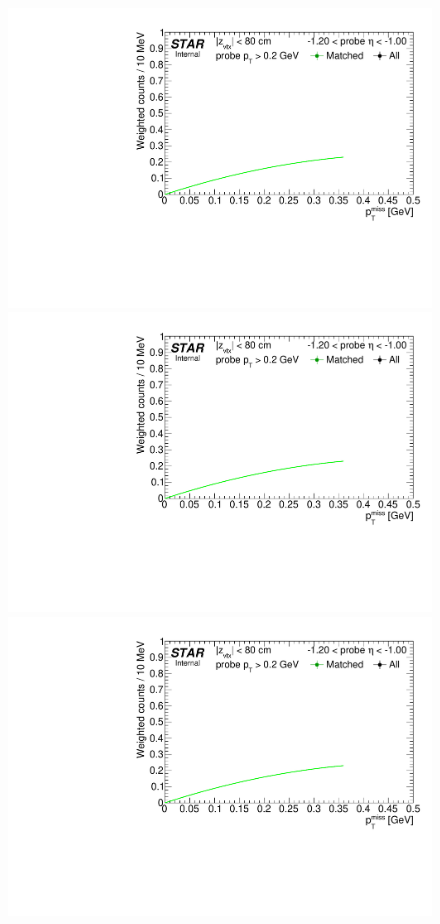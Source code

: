 \begin{figure}[ht]\ContinuedFloat
\centering
\parbox{0.495\textwidth}{
  \centering
  
  \includegraphics[width=\linewidth,page=6]{graphics/correctionsToEff/TOF_tagAndProbe/Fitting_effVsEta_data.CPT.pdf}\\
  \includegraphics[width=\linewidth,page=7]{graphics/correctionsToEff/TOF_tagAndProbe/Fitting_effVsEta_data.CPT.pdf}\\
  \includegraphics[width=\linewidth,page=8]{graphics/correctionsToEff/TOF_tagAndProbe/Fitting_effVsEta_data.CPT.pdf}\\
}
\end{figure}
